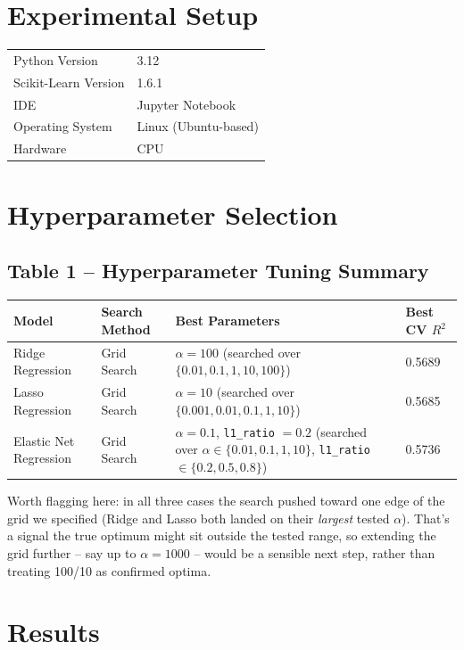 \documentclass[12pt,a4paper]{article}
\begin{document}
\section{Experimental Setup}
\begin{tabular}{ll}
\toprule
Python Version & 3.12 \\
Scikit-Learn Version & 1.6.1 \\
IDE & Jupyter Notebook \\
Operating System & Linux (Ubuntu-based) \\
Hardware & CPU \\
\bottomrule
\end{tabular}

\section{Hyperparameter Selection}\label{sec:hyperparam}

\subsection*{Table 1 -- Hyperparameter Tuning Summary}
\begin{longtable}{|p{3.2cm}|p{2.6cm}|p{5.5cm}|p{2.3cm}|}
\hline
\textbf{Model} & \textbf{Search Method} & \textbf{Best Parameters} & \textbf{Best CV $R^2$} \\ \hline
Ridge Regression & Grid Search & $\alpha = 100$ (searched over $\{0.01, 0.1, 1, 10, 100\}$) & 0.5689 \\ \hline
Lasso Regression & Grid Search & $\alpha = 10$ (searched over $\{0.001, 0.01, 0.1, 1, 10\}$) & 0.5685 \\ \hline
Elastic Net Regression & Grid Search & $\alpha = 0.1$, \texttt{l1\_ratio} $= 0.2$ (searched over $\alpha \in \{0.01,0.1,1,10\}$, \texttt{l1\_ratio} $\in \{0.2,0.5,0.8\}$) & 0.5736 \\ \hline
\end{longtable}

Worth flagging here: in all three cases the search pushed toward one edge of the grid we specified (Ridge and Lasso both landed on their \textit{largest} tested $\alpha$). That's a signal the true optimum might sit outside the tested range, so extending the grid further -- say up to $\alpha=1000$ -- would be a sensible next step, rather than treating 100/10 as confirmed optima.

\section{Results}\label{sec:results}
\end{document}
